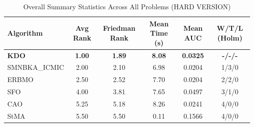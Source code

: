 \begin{table}[htbp]
\centering
\caption{Overall Summary Statistics Across All Problems (HARD VERSION)}
\label{tab:summary}
\small
\begin{tabular}{lccccc}
\toprule
\textbf{Algorithm} & \textbf{Avg Rank} & \textbf{Friedman Rank} & \textbf{Mean Time (s)} & \textbf{Mean AUC} & \textbf{W/T/L (Holm)} \\
\midrule
\textbf{KDO} & \textbf{1.00} & \textbf{1.89} & \textbf{8.08} & \textbf{0.0325} & \textbf{-/-/-} \\
SMNBKA_ICMIC & 2.00 & 2.10 & 6.98 & 0.0204 & 1/3/0 \\
ERBMO & 2.50 & 2.52 & 7.70 & 0.0204 & 2/2/0 \\
SFO & 4.00 & 3.81 & 7.65 & 0.0497 & 3/1/0 \\
CAO & 5.25 & 5.18 & 8.26 & 0.0241 & 4/0/0 \\
StMA & 5.50 & 5.50 & 0.11 & 0.1566 & 4/0/0 \\
\bottomrule
\end{tabular}
\end{table}
